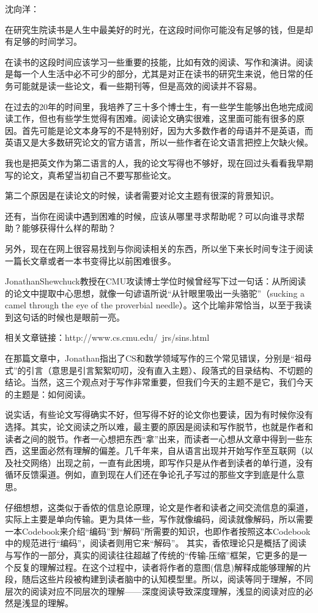 沈向洋：

在研究生院读书是人生中最美好的时光，在这段时间你可能没有足够的钱，但是却有足够的时间学习。

在读书的这段时间应该学习一些重要的技能，比如有效的阅读、写作和演讲。阅读是每一个人生活中必不可少的部分，尤其是对正在读书的研究生来说，他日常的任务可能就是读一些论文，看一些期刊等，但是高效的阅读并不容易。

在过去的20年的时间里，我培养了三十多个博士生，有一些学生能够出色地完成阅读工作，但也有些学生觉得有困难。阅读论文确实很难，这里面可能有很多的原因。首先可能是论文本身写的不是特别好，因为大多数作者的母语并不是英语，而英语又是大多数研究论文的官方语言，所以一些作者在论文语言把控上欠缺火候。

我也是把英文作为第二语言的人，我的论文写得也不够好，现在回过头看看我早期写的论文，真希望当初自己不要写那些论文。

第二个原因是在读论文的时候，读者需要对论文主题有很深的背景知识。

还有，当你在阅读中遇到困难的时候，应该从哪里寻求帮助呢？可以向谁寻求帮助？能够获得什么样的帮助？

另外，现在在网上很容易找到与你阅读相关的东西，所以坐下来长时间专注于阅读一篇长文章或者一本书变得比以前困难很多。

JonathanShewchuck教授在CMU攻读博士学位时候曾经写下过一句话：从所阅读的论文中提取中心思想，就像一句谚语所说“从针眼里吸出一头骆驼”（sucking a camel through the eye of the proverbial needle）。这个比喻非常恰当，以至于我读到这句话的时候也是眼前一亮。

相关文章链接：http://www.cs.cmu.edu/~jrs/sins.html

在那篇文章中，Jonathan指出了CS和数学领域写作的三个常见错误，分别是“祖母式”的引言（意思是引言絮絮叨叨，没有直入主题）、段落式的目录结构、不切题的结论。当然，这三个观点对于写作非常重要，但我们今天的主题不是它，我们今天的主题是：如何阅读。

说实话，有些论文写得确实不好，但写得不好的论文你也要读，因为有时候你没有选择。其实，论文阅读之所以难，最主要的原因是阅读和写作脱节，也就是作者和读者之间的脱节。作者一心想把东西“拿”出来，而读者一心想从文章中得到一些东西，这里面必然有理解的偏差。几千年来，自从语言出现并开始写作至互联网（以及社交网络）出现之前，一直有此困境，即写作只是从作者到读者的单行道，没有循环反馈渠道。例如，直到现在人们还在争论孔子写过的那些文字到底是什么意思。

仔细想想，这类似于香侬的信息论原理，论文是作者和读者之间交流信息的渠道，实际上主要是单向传输。更为具体一些，写作就像编码，阅读就像解码，所以需要一本Codebook来介绍“编码”到“解码”所需要的知识，也即作者按照这本Codebook中的规范进行“编码”，阅读者则用它来“解码”。
其实，香侬理论只是概括了阅读与写作的一部分，真实的阅读往往超越了传统的“传输-压缩”框架，它更多的是一个反复的理解过程。在这个过程中，读者将作者的意图(信息)解释成能够理解的片段，随后这些片段被构建到读者脑中的认知模型里。所以，阅读等同于理解，不同层次的阅读对应不同层次的理解——深度阅读导致深度理解，浅显的阅读对应的必然是浅显的理解。

